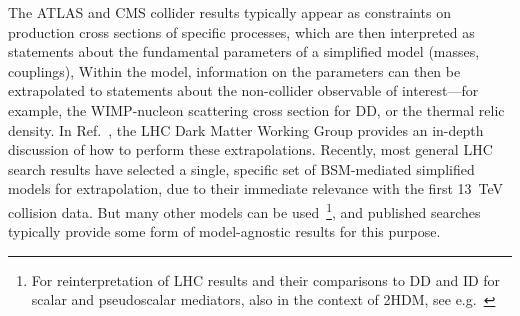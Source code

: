
The ATLAS and CMS collider results typically appear as constraints on production cross sections of specific processes, which are then interpreted as statements about the fundamental parameters of a simplified model (masses, couplings), Within the model, information on the parameters can then be extrapolated to statements about the non-collider observable of interest---for example, the WIMP-nucleon scattering cross section for DD, or the thermal relic density.
In Ref.~\cite{Boveia:2016mrp}, the LHC Dark Matter Working Group provides an in-depth discussion of how to perform these extrapolations.
Recently, most general LHC search results have selected a single, specific set of BSM-mediated simplified models for extrapolation, due to their immediate relevance with the first 13~TeV collision data. But many other models can be used~\footnote{For reinterpretation of LHC results and their comparisons to DD and ID for scalar and pseudoscalar mediators, also in the context of 2HDM, see e.g.~\cite{Athron:2017kgt,Banerjee:2017wxi,Bell:2016ekl}}, and published searches typically provide some form of model-agnostic results for this purpose.%

